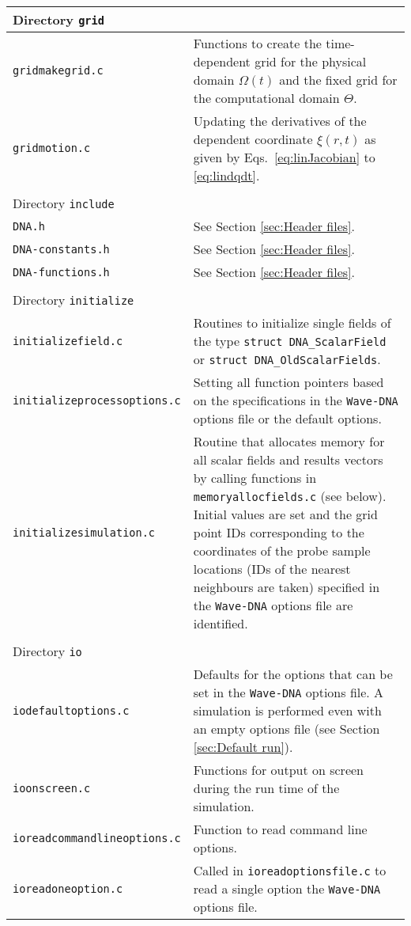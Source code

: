 \begin{longtable}{p{} p{}}
\\
\hline Directory {\tt grid} &\\ \hline
{\tt gridmakegrid.c} & Functions to create the time-dependent grid for the physical domain $\Omega\left(t\right)$ and the fixed grid for the computational domain $\Theta$. \\
{\tt gridmotion.c} & Updating the derivatives of the dependent coordinate $\xi\left(r,t\right)$ as given by Eqs.~\eqref{eq:linJacobian} to \eqref{eq:lindqdt}. \\
\\
\hline Directory {\tt include} &\\ \hline
{\tt DNA.h} & See Section \ref{sec:Header files}. \\
{\tt DNA-constants.h} & See Section \ref{sec:Header files}. \\
{\tt DNA-functions.h} & See Section \ref{sec:Header files}. \\
\\
\hline Directory {\tt initialize} &\\ \hline
{\tt initializefield.c} & Routines to initialize single fields of the type {\tt struct DNA\_ScalarField} or {\tt struct DNA\_OldScalarFields}. \\
{\tt initializeprocessoptions.c} & Setting all function pointers based on the specifications in the {\tt Wave-DNA} options file or the default options. \\
{\tt initializesimulation.c} & Routine that allocates memory for all scalar fields and results vectors by calling functions in {\tt memoryallocfields.c} (see below). Initial values are set and the grid point IDs corresponding to the coordinates of the probe sample locations (IDs of the nearest neighbours are taken) specified in the {\tt Wave-DNA} options file are identified. \\
\\
\hline Directory {\tt io} &\\ \hline
{\tt iodefaultoptions.c} & Defaults for the options that can be set in the {\tt Wave-DNA} options file. A simulation is performed even with an empty options file (see Section \ref{sec:Default run}). \\
{\tt ioonscreen.c} & Functions for output on screen during the run time of the simulation. \\
{\tt ioreadcommandlineoptions.c} & Function to read command line options. \\
{\tt ioreadoneoption.c} & Called in {\tt ioreadoptionsfile.c} to read a single option the {\tt Wave-DNA} options file. \\

\end{longtable}
